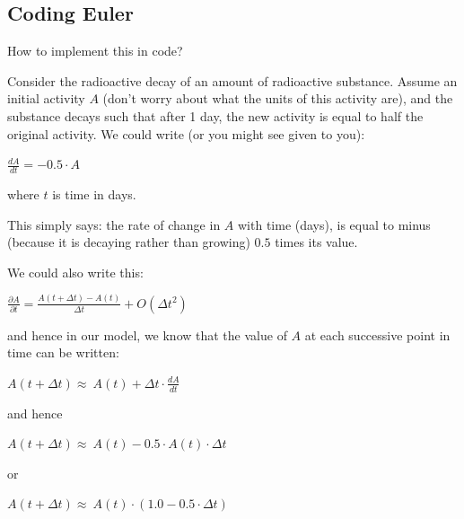 \documentclass{tufte-book} %
\begin{document}

\subsection*{Coding Euler}

How to implement this in code?

Consider the radioactive decay of an amount of radioactive substance. Assume an initial activity \(A\) (don't worry about what the units of this activity are), and the substance decays such that after 1 day, the new activity is equal to half the original activity. We could write (or you might see given to you):

\vspace{2mm}
\(\frac{dA}{dt}=-0.5\cdot A\)
\vspace{2mm}

\noindent where \(t\) is time in days. 

This simply says: the rate of change in \(A\) with time (days), is equal to minus (because it is decaying rather than growing) \(0.5\) times its value.

We could also write this:

\vspace{2mm}\(
\frac{\partial A}{\partial t} = \frac{A(t+\Delta t)-A(t)}{\Delta t} + O(\Delta t^{2})
\)\vspace{2mm}

\noindent and hence in our model, we know that the value of \(A\) at each successive point in time can be written:

\vspace{2mm}\(
A(t+\Delta t) \approx\ A(t) + \Delta t\cdot\frac{dA}{dt}
\)\vspace{2mm}

\noindent and hence

\vspace{2mm}\(
A(t+\Delta t) \approx\ A(t) -0.5\cdot A(t) \cdot \Delta t
\)\vspace{2mm}

\noindent or

\vspace{2mm}\(
A(t+\Delta t) \approx\ A(t)\cdot(1.0-0.5\cdot \Delta t)
\)\vspace{2mm}
\end{document}
